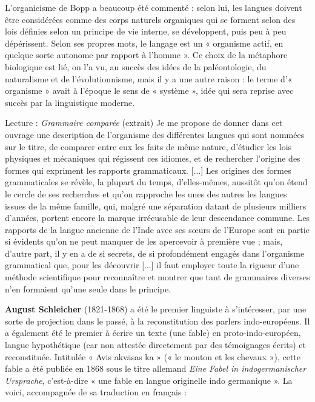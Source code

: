 L’organicisme de Bopp a beaucoup été commenté : selon lui, les langues doivent être considérées comme des corps naturels organiques qui se forment selon des lois définies selon un principe de vie interne, se développent, puis peu à peu dépérissent. Selon ses propres mots, le langage est un « organisme actif, en quelque sorte autonome par rapport à l’homme ». Ce choix de la métaphore biologique est lié, on l’a vu, au succès des idées de la paléontologie, du naturalisme et de l’évolutionnisme, mais il y a une autre raison : le terme d’« organisme » avait à l’époque le sens de « système », idée qui sera reprise avec succès par la linguistique moderne.

\begin{lecture}{Lecture : \textit{Grammaire comparée} (extrait)}
Je me propose de donner dans cet ouvrage une description de l’organisme des différentes langues qui sont nommées sur le titre, de comparer entre eux les faits de même nature, d’étudier les lois physiques et mécaniques qui régissent ces idiomes, et de rechercher l’origine des formes qui expriment les rapports grammaticaux. [...] Les origines des formes grammaticales se révèle, la plupart du temps, d’elles-mêmes, aussitôt qu’on étend le cercle de ses recherches et qu’on rapproche les unes des autres les langues issues de la même famille, qui, malgré une séparation datant de plusieurs milliers d’années, portent encore la marque irrécusable de leur descendance commune. Les rapports de la langue ancienne de l’Inde avec ses sœurs de l’Europe sont en partie si évidents qu’on ne peut manquer de les apercevoir à première vue ; mais, d’autre part, il y en a de si secrets, de si profondément engagés dans l’organisme grammatical que, pour les découvrir [...] il faut employer toute la rigueur d’une méthode scientifique pour reconnaître et montrer que tant de grammaires diverses n’en formaient qu’une seule dans le principe.
\end{lecture}

\textbf{August Schleicher} (1821-1868) a été le premier linguiste à s’intéresser, par une sorte de projection dans le passé, à la reconstitution des parlers indo-européens. Il a également été le premier à écrire un texte (une fable) en proto-indo-européen, langue hypothétique (car non attestée directement par des témoignages écrits) et reconstituée. Intitulée « Avis akvāsas ka » (« le mouton et les chevaux »), cette fable a été publiée en 1868 sous le titre allemand \textit{Eine Fabel in indogermanischer Ursprache}, c’est-à-dire « une fable en langue originelle indo germanique ». La voici, accompagnée de sa traduction en français :


